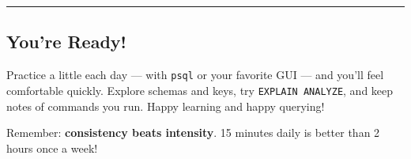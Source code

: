 \documentclass[
  letterpaper,
  DIV=11,
  numbers=noendperiod]{scrartcl}
\begin{document}
\begin{center}\rule{0.5\linewidth}{0.5pt}\end{center}

\subsection{You're Ready!}\label{youre-ready}

Practice a little each day --- with \texttt{psql} or your favorite GUI
--- and you'll feel comfortable quickly. Explore schemas and keys, try
\texttt{EXPLAIN\ ANALYZE}, and keep notes of commands you run. Happy
learning and happy querying! 🎉

Remember: \textbf{consistency beats intensity}. 15 minutes daily is
better than 2 hours once a week!
\end{document}
